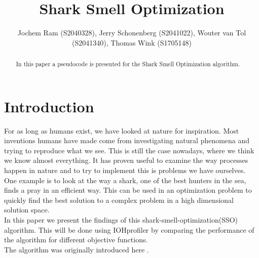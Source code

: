 \documentclass[runningheads]{llncs}
\begin{document}
%
\title{Shark Smell Optimization}
%
%
\author{Jochem Ram (S2040328), Jerry Schonenberg (S2041022), Wouter van Tol (S2041340), Thomas Wink (S1705148)}
%
%
%
\maketitle              %
%
\begin{abstract}
In this paper a pseudocode is presented for the Shark Smell Optimization algorithm.
\end{abstract}





\section{Introduction}
For as long as humans exist, we have looked at nature for inspiration. Most inventions humans have made come from investigating natural phenomena and trying to reproduce what we see. This is still the case nowadays, where we think we know almost everything. It has proven useful to examine the way processes happen in nature and to try to implement this is problems we have ourselves. One example is to look at the way a shark, one of the best hunters in the sea, finds a pray in an efficient way. This can be used in an optimization problem to quickly find the best solution to a complex problem in a high dimensional solution space.\\
In this paper we present the findings of this shark-smell-optimization(SSO) algorithm. This will be done using IOHprofiler by comparing the performance of the algorithm for different objective functions.\\
The algorithm was originally introduced here \cite{abedinia2014shark}.
\end{document}
